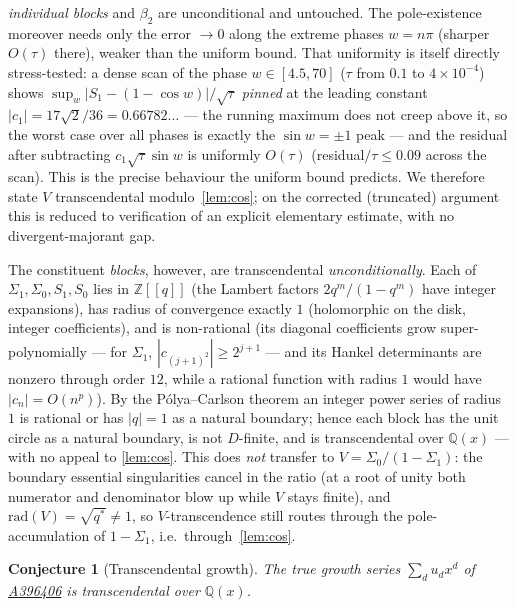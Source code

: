 \documentclass[11pt,a4paper]{article}
\newtheorem{conjecture}[theorem]{Conjecture}
\theoremstyle{remark}
\theoremstyle{plain}
\begin{document}
\emph{individual blocks} and $\beta_2$ are unconditional and untouched.  The pole-existence
moreover needs only the error $\to0$ along the extreme phases $w=n\pi$ (sharper $O(\tau)$
there), weaker than the uniform bound.  That uniformity is itself directly stress-tested: a dense scan of the phase $w\in[4.5,70]$
($\tau$ from $0.1$ to $4\times10^{-4}$) shows $\sup_w|S_1-(1-\cos w)|/\sqrt\tau$
\emph{pinned} at the leading constant $|c_1|=17\sqrt2/36=0.66782\ldots$ --- the
running maximum does not creep above it, so the worst case over all phases is
exactly the $\sin w=\pm1$ peak --- and the residual after subtracting
$c_1\sqrt\tau\sin w$ is uniformly $O(\tau)$ (residual$/\tau\le0.09$ across the
scan). This is the precise behaviour the uniform bound predicts.  We therefore
state $V$ transcendental modulo~\eqref{lem:cos}; on the corrected (truncated)
argument this is reduced to verification of an explicit elementary estimate, with
no divergent-majorant gap.

The constituent \emph{blocks}, however, are transcendental
\emph{unconditionally}.  Each of $\Sigma_1, \Sigma_0, S_1, S_0$ lies in
$\mathbb{Z}[[q]]$ (the Lambert factors $2q^m/(1-q^m)$ have integer
expansions), has radius of convergence exactly $1$ (holomorphic on the disk,
integer coefficients), and is non-rational (its diagonal coefficients grow
super-polynomially --- for $\Sigma_1$, $|c_{(j+1)^2}| \ge 2^{j+1}$ --- and
its Hankel determinants are nonzero through order $12$, while a rational
function with radius $1$ would have $|c_n| = O(n^p)$).  By the P\'olya--Carlson theorem an
integer power series of radius $1$ is rational or has $|q|=1$ as a natural
boundary; hence each block has the unit circle as a natural boundary, is not
$D$-finite, and is transcendental over $\mathbb{Q}(x)$ --- with no appeal to
\eqref{lem:cos}.  This does \emph{not} transfer to $V = \Sigma_0/(1-\Sigma_1)$:
the boundary essential singularities cancel in the ratio (at a root of unity
both numerator and denominator blow up while $V$ stays finite), and
$\mathrm{rad}(V) = \sqrt{q^*} \ne 1$, so $V$-transcendence still routes through
the pole-accumulation of $1-\Sigma_1$, i.e.\ through~\eqref{lem:cos}.

\begin{conjecture}[Transcendental growth]
\label{conj:algebraic-growth}
The true growth series $\sum_d u_d x^d$ of
\href{https://oeis.org/A396406}{A396406} is transcendental over
$\mathbb{Q}(x)$.
\end{conjecture}
\end{document}
